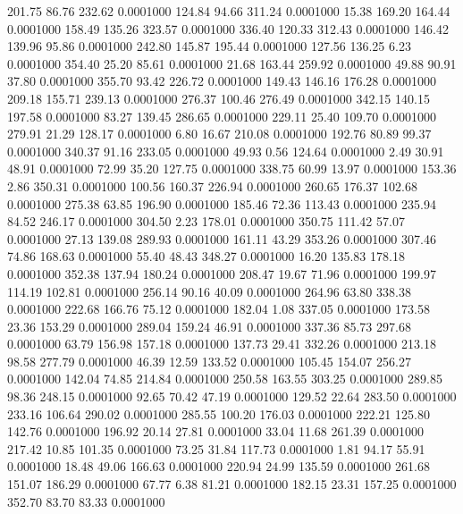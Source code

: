  201.75   86.76  232.62   0.0001000
 124.84   94.66  311.24   0.0001000
  15.38  169.20  164.44   0.0001000
 158.49  135.26  323.57   0.0001000
 336.40  120.33  312.43   0.0001000
 146.42  139.96   95.86   0.0001000
 242.80  145.87  195.44   0.0001000
 127.56  136.25    6.23   0.0001000
 354.40   25.20   85.61   0.0001000
  21.68  163.44  259.92   0.0001000
  49.88   90.91   37.80   0.0001000
 355.70   93.42  226.72   0.0001000
 149.43  146.16  176.28   0.0001000
 209.18  155.71  239.13   0.0001000
 276.37  100.46  276.49   0.0001000
 342.15  140.15  197.58   0.0001000
  83.27  139.45  286.65   0.0001000
 229.11   25.40  109.70   0.0001000
 279.91   21.29  128.17   0.0001000
   6.80   16.67  210.08   0.0001000
 192.76   80.89   99.37   0.0001000
 340.37   91.16  233.05   0.0001000
  49.93    0.56  124.64   0.0001000
   2.49   30.91   48.91   0.0001000
  72.99   35.20  127.75   0.0001000
 338.75   60.99   13.97   0.0001000
 153.36    2.86  350.31   0.0001000
 100.56  160.37  226.94   0.0001000
 260.65  176.37  102.68   0.0001000
 275.38   63.85  196.90   0.0001000
 185.46   72.36  113.43   0.0001000
 235.94   84.52  246.17   0.0001000
 304.50    2.23  178.01   0.0001000
 350.75  111.42   57.07   0.0001000
  27.13  139.08  289.93   0.0001000
 161.11   43.29  353.26   0.0001000
 307.46   74.86  168.63   0.0001000
  55.40   48.43  348.27   0.0001000
  16.20  135.83  178.18   0.0001000
 352.38  137.94  180.24   0.0001000
 208.47   19.67   71.96   0.0001000
 199.97  114.19  102.81   0.0001000
 256.14   90.16   40.09   0.0001000
 264.96   63.80  338.38   0.0001000
 222.68  166.76   75.12   0.0001000
 182.04    1.08  337.05   0.0001000
 173.58   23.36  153.29   0.0001000
 289.04  159.24   46.91   0.0001000
 337.36   85.73  297.68   0.0001000
  63.79  156.98  157.18   0.0001000
 137.73   29.41  332.26   0.0001000
 213.18   98.58  277.79   0.0001000
  46.39   12.59  133.52   0.0001000
 105.45  154.07  256.27   0.0001000
 142.04   74.85  214.84   0.0001000
 250.58  163.55  303.25   0.0001000
 289.85   98.36  248.15   0.0001000
  92.65   70.42   47.19   0.0001000
 129.52   22.64  283.50   0.0001000
 233.16  106.64  290.02   0.0001000
 285.55  100.20  176.03   0.0001000
 222.21  125.80  142.76   0.0001000
 196.92   20.14   27.81   0.0001000
  33.04   11.68  261.39   0.0001000
 217.42   10.85  101.35   0.0001000
  73.25   31.84  117.73   0.0001000
   1.81   94.17   55.91   0.0001000
  18.48   49.06  166.63   0.0001000
 220.94   24.99  135.59   0.0001000
 261.68  151.07  186.29   0.0001000
  67.77    6.38   81.21   0.0001000
 182.15   23.31  157.25   0.0001000
 352.70   83.70   83.33   0.0001000

